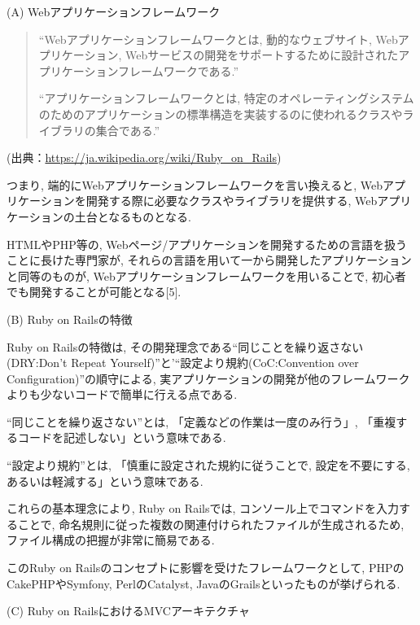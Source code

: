 \begin{description}
\item (A) Webアプリケーションフレームワーク

\begin{quotation}
\begin{screen}
“Webアプリケーションフレームワークとは, 動的なウェブサイト, Webアプリケーション, Webサービスの開発をサポートするために設計されたアプリケーションフレームワークである.”

“アプリケーションフレームワークとは, 特定のオペレーティングシステムのためのアプリケーションの標準構造を実装するのに使われるクラスやライブラリの集合である.”
\end{screen}
\end{quotation}
\begin{flushright}
(出典：\url{https://ja.wikipedia.org/wiki/Ruby_on_Rails})
\end{flushright}

つまり, 端的にWebアプリケーションフレームワークを言い換えると, Webアプリケーションを開発する際に必要なクラスやライブラリを提供する, Webアプリケーションの土台となるものとなる.

HTMLやPHP等の, Webページ/アプリケーションを開発するための言語を扱うことに長けた専門家が, それらの言語を用いて一から開発したアプリケーションと同等のものが, Webアプリケーションフレームワークを用いることで, 初心者でも開発することが可能となる[5].

\item (B) Ruby on Railsの特徴

Ruby on Railsの特徴は, その開発理念である“同じことを繰り返さない(DRY:Don't Repeat Yourself)”と'“設定より規約(CoC:Convention over Configuration)”の順守による, 実アプリケーションの開発が他のフレームワークよりも少ないコードで簡単に行える点である.

“同じことを繰り返さない”とは, 「定義などの作業は一度のみ行う」, 「重複するコードを記述しない」という意味である.

“設定より規約”とは, 「慎重に設定された規約に従うことで, 設定を不要にする, あるいは軽減する」という意味である.

これらの基本理念により, Ruby on Railsでは, コンソール上でコマンドを入力することで, 命名規則に従った複数の関連付けられたファイルが生成されるため, ファイル構成の把握が非常に簡易である.

このRuby on Railsのコンセプトに影響を受けたフレームワークとして, PHPのCakePHPやSymfony, PerlのCatalyst, JavaのGrailsといったものが挙げられる.

\item (C) Ruby on RailsにおけるMVCアーキテクチャ


\end{description}
